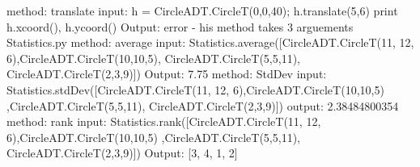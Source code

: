 \documentclass[12pt]{article}
\begin{document}
\newline method: translate
\newline input: h = CircleADT.CircleT(0,0,40); h.translate(5,6)    print h.xcoord(), h.ycoord()
\newline Output: error - his method takes 3 arguements
\newline
\newline Statistics.py
\newline 
\newline method: average
\newline input: Statistics.average([CircleADT.CircleT(11, 12, 6),CircleADT.CircleT(10,10,5),
\newline CircleADT.CircleT(5,5,11), CircleADT.CircleT(2,3,9)])
\newline Output: 7.75
\newline
\newline method: StdDev
\newline input: Statistics.stdDev([CircleADT.CircleT(11, 12, 6),CircleADT.CircleT(10,10,5)
\newline ,CircleADT.CircleT(5,5,11),  CircleADT.CircleT(2,3,9)])
\newline output: 2.38484800354
\newline
\newline method: rank
\newline input: Statistics.rank([CircleADT.CircleT(11, 12, 6),CircleADT.CircleT(10,10,5)
\newline ,CircleADT.CircleT(5,5,11), CircleADT.CircleT(2,3,9)])
\newline Output: [3, 4, 1, 2]

\newpage
\end{document}
